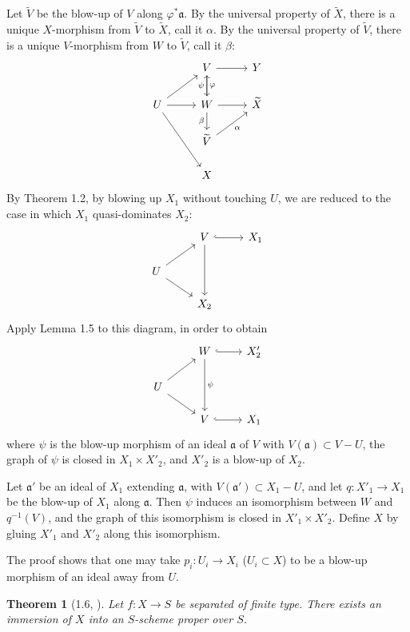 \documentclass[10pt,a4paper]{article}
\theoremstyle{deligne}
\newtheorem*{theorem*}{Theorem}
\newcommand{\heading}[1]{\vspace{0.65em}\noindent{\bfseries #1}\quad}
\begin{document}
Let \(\widetilde V\) be the blow-up of \(V\) along \(\varphi^*\mathfrak a\). By the universal property of \(\widetilde X\), there is a unique \(X\)-morphism from \(\widetilde V\) to \(\widetilde X\), call it \(\alpha\). By the universal property of \(\widetilde V\), there is a unique \(V\)-morphism from \(W\) to \(\widetilde V\), call it \(\beta\):
\[
\begin{tikzcd}[column sep=2.6em,row sep=1.6em]
& V \arrow[r] \arrow[d,"\varphi"] & Y\\
U \arrow[ur] \arrow[r] \arrow[ddr] & W \arrow[r] \arrow[u,"\psi"] \arrow[d,"\beta"'] & \widetilde X\\
& \widetilde V \arrow[ur,"\alpha"']\\
& X
\end{tikzcd}
\]
By Theorem 1.2, by blowing up \(X_1\) without touching \(U\), we are reduced to the case in which \(X_1\) quasi-dominates \(X_2\):
\[
\begin{tikzcd}[column sep=2.4em,row sep=1.5em]
& V \arrow[r,hook] \arrow[dd] & X_1 \\
U \arrow[ur] \arrow[dr] & {\phantom{X}} & {\phantom{X}} \\
& X_2
\end{tikzcd}
\]
Apply Lemma 1.5 to this diagram, in order to obtain
\[
\begin{tikzcd}[column sep=2.4em,row sep=1.5em]
& W \arrow[r,hook] \arrow[dd,"\psi"] & X'_2 \\
U \arrow[ur] \arrow[dr] & {\phantom{X}} & {\phantom{X}} \\
& V \arrow[r,hook] & X_1
\end{tikzcd}
\]
where \(\psi\) is the blow-up morphism of an ideal \(\mathfrak a\) of \(V\) with \(V(\mathfrak a)\subset V-U\), the graph of \(\psi\) is closed in \(X_1\times X'_2\), and \(X'_2\) is a blow-up of \(X_2\).

Let \(\mathfrak a'\) be an ideal of \(X_1\) extending \(\mathfrak a\), with \(V(\mathfrak a')\subset X_1-U\), and let \(q:X'_1\to X_1\) be the blow-up of \(X_1\) along \(\mathfrak a\). Then \(\psi\) induces an isomorphism between \(W\) and \(q^{-1}(V)\), and the graph of this isomorphism is closed in \(X'_1\times X'_2\). Define \(X\) by gluing \(X'_1\) and \(X'_2\) along this isomorphism.

\heading{Remark.}
The proof shows that one may take \(p_i:U_i\to X_i\) (\(U_i\subset X\)) to be a blow-up morphism of an ideal away from \(U\).

\begin{theorem*}[1.6, {}]
Let \(f:X\to S\) be separated of finite type. There exists an immersion of \(X\) into an \(S\)-scheme proper over \(S\).
\end{theorem*}
\end{document}
